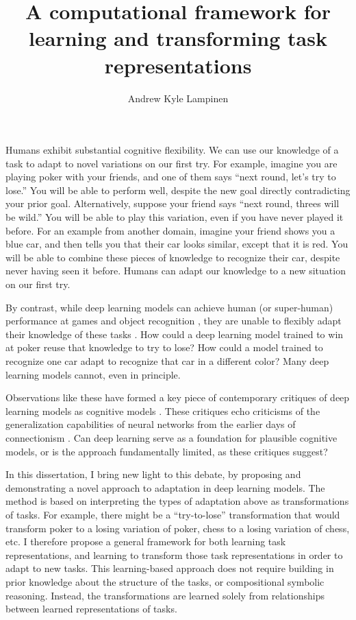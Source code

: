\documentclass[12pt]{article}
\title{A computational framework for learning and transforming task representations}
\author{Andrew Kyle Lampinen}
\date{}
\begin{document}
\maketitle
\thispagestyle{fancy}

Humans exhibit substantial cognitive flexibility. We can use our knowledge of a task to adapt to novel variations on our first try. For example, imagine you are playing poker with your friends, and one of them says ``next round, let's try to lose.'' You will be able to perform well, despite the new goal directly contradicting your prior goal. Alternatively, suppose your friend says ``next round, threes will be wild.'' You will be able to play this variation, even if you have never played it before. For an example from another domain, imagine your friend shows you a blue car, and then tells you that their car looks similar, except that it is red. You will be able to combine these pieces of knowledge to recognize their car, despite never having seen it before. Humans can adapt our knowledge to a new situation on our first try. 

By contrast, while deep learning models can achieve human (or super-human) performance at games \citep{Silver2017,Vinyals2019} and object recognition \citep{Szegedy2016}, they are unable to flexibly adapt their knowledge of these tasks \citep{Lake2016}. How could a deep learning model trained to win at poker reuse that knowledge to try to lose? How could a model trained to recognize one car adapt to recognize that car in a different color? Many deep learning models cannot, even in principle.  

Observations like these have formed a key piece of contemporary critiques of deep learning models as cognitive models \citep{Lake2016,Marcus2018}. These critiques echo criticisms of the generalization capabilities of neural networks from the earlier days of connectionism \citep{Fodor1988}. Can deep learning serve as a foundation for plausible cognitive models, or is the approach fundamentally limited, as these critiques suggest? 

In this dissertation, I bring new light to this debate, by proposing and demonstrating a novel approach to adaptation in deep learning models. The method is based on interpreting the types of adaptation above as transformations of tasks. For example, there might be a ``try-to-lose'' transformation that would transform poker to a losing variation of poker, chess to a losing variation of chess, etc. I therefore propose a general framework for both learning task representations, and learning to transform those task representations in order to adapt to new tasks. This learning-based approach does not require building in prior knowledge about the structure of the tasks, or compositional symbolic reasoning. Instead, the transformations are learned solely from relationships between learned representations of tasks. 
\end{document}
